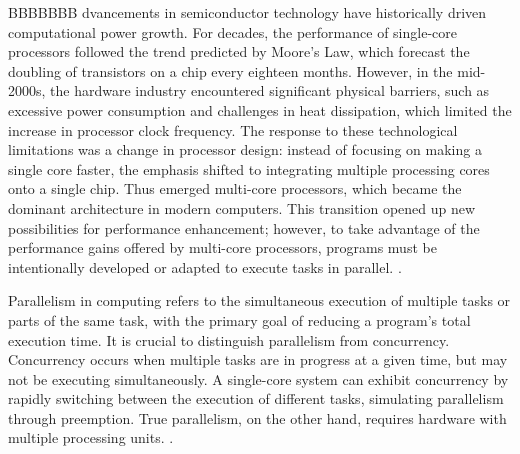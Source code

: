 

BBBBBBB dvancements in semiconductor technology have historically driven computational power growth. For decades, the performance of single-core processors followed the trend predicted by Moore's Law, which forecast the doubling of transistors on a chip every eighteen months. However, in the mid-2000s, the hardware industry encountered significant physical barriers, such as excessive power consumption and challenges in heat dissipation, which limited the increase in processor clock frequency. The response to these technological limitations was a change in processor design: instead of focusing on making a single core faster, the emphasis shifted to integrating multiple processing cores onto a single chip. Thus emerged multi-core processors, which became the dominant architecture in modern computers. This transition opened up new possibilities for performance enhancement; however, to take advantage of the performance gains offered by multi-core processors, programs must be intentionally developed or adapted to execute tasks in parallel. \cite{Pacheco2011}.


Parallelism in computing refers to the simultaneous execution of multiple tasks or parts of the same task, with the primary goal of reducing a program's total execution time. It is crucial to distinguish parallelism from concurrency. Concurrency occurs when multiple tasks are in progress at a given time, but may not be executing simultaneously. A single-core system can exhibit concurrency by rapidly switching between the execution of different tasks, simulating parallelism through preemption. True parallelism, on the other hand, requires hardware with multiple processing units. \cite{Butenhof1997}.


